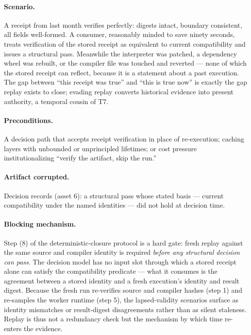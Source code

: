 \paragraph{Scenario.} A receipt from last month verifies perfectly: digests intact, boundary consistent, all fields well-formed. A consumer, reasonably minded to save ninety seconds, treats verification of the stored receipt as equivalent to current compatibility and issues a structural pass. Meanwhile the interpreter was patched, a dependency wheel was rebuilt, or the compiler file was touched and reverted --- none of which the stored receipt can reflect, because it is a statement about a past execution. The gap between ``this receipt was true'' and ``this is true now'' is exactly the gap replay exists to close; evading replay converts historical evidence into present authority, a temporal cousin of T7.

\paragraph{Preconditions.} A decision path that accepts receipt verification in place of re-execution; caching layers with unbounded or unprincipled lifetimes; or cost pressure institutionalizing ``verify the artifact, skip the run.''

\paragraph{Artifact corrupted.} Decision records (asset 6): a structural pass whose stated basis --- current compatibility under the named identities --- did not hold at decision time.

\paragraph{Blocking mechanism.} Step (8) of the deterministic-closure protocol is a hard gate: fresh replay against the same source and compiler identity is required \emph{before any structural decision can pass}. The decision model has no input slot through which a stored receipt alone can satisfy the compatibility predicate --- what it consumes is the agreement between a stored identity and a fresh execution's identity and result digest. Because the fresh run re-verifies source and compiler hashes (step 1) and re-samples the worker runtime (step 5), the lapsed-validity scenarios surface as identity mismatches or result-digest disagreements rather than as silent staleness. Replay is thus not a redundancy check but the mechanism by which time re-enters the evidence.

